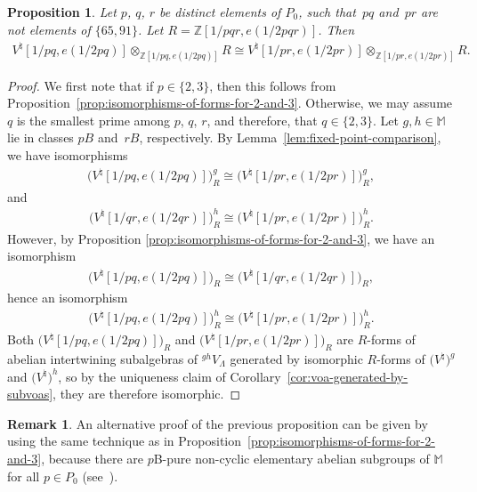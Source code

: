 \documentclass[pdftex]{sigma}
\newcommand{\bM}{\mathbb{M}}
\newcommand{\bZ}{\mathbb{Z}}
\newtheorem{prop}[thm]{Proposition}
\theoremstyle{definition}
\newtheorem{rem}[thm]{Remark}
\begin{document}
\begin{prop} \label{prop:full-comparison-of-forms} Let $p$, $q$, $r$ be distinct elements of $P_0$, such that~$pq$ and~$pr$ are not elements of $\{ 65, 91\}$. Let $R = \bZ[1/pqr,e(1/2pqr)]$. Then
\begin{gather*} V^\natural[1/pq, e(1/2pq)] \otimes_{\bZ[1/pq, e(1/2pq)]} R \cong V^\natural[1/pr, e(1/2pr)] \otimes_{\bZ[1/pr, e(1/2pr)]} R. \end{gather*}
\end{prop}
\begin{proof}
We first note that if $p \in \{2,3\}$, then this follows from Proposition~\ref{prop:isomorphisms-of-forms-for-2-and-3}. Otherwise, we may assume $q$ is the smallest prime among $p$, $q$, $r$, and therefore, that $q \in \{2,3\}$. Let $g,h \in \bM$ lie in classes $pB$ and~$rB$, respectively. By Lemma~\ref{lem:fixed-point-comparison}, we have isomorphisms
\begin{gather*} \big(V^\natural[1/pq,e(1/2pq)]\big)^g_R \cong \big(V^\natural[1/pr,e(1/2pr)]\big)^g_R, \end{gather*}
and
\begin{gather*} \big(V^\natural[1/qr,e(1/2qr)]\big)^h_R \cong \big(V^\natural[1/pr,e(1/2pr)]\big)^h_R. \end{gather*}
However, by Proposition \ref{prop:isomorphisms-of-forms-for-2-and-3}, we have an isomorphism
\begin{gather*} \big(V^\natural[1/pq,e(1/2pq)]\big)_R \cong \big(V^\natural[1/qr,e(1/2qr)]\big)_R, \end{gather*}
hence an isomorphism
\begin{gather*} \big(V^\natural[1/pq,e(1/2pq)]\big)^h_R \cong \big(V^\natural[1/pr,e(1/2pr)]\big)^h_R. \end{gather*}
Both $\big(V^\natural[1/pq,e(1/2pq)]\big)_R$ and $\big(V^\natural[1/pr,e(1/2pr)]\big)_R$ are $R$-forms of abelian intertwining subalgebras of ${}^{gh}V_\Lambda$ generated by isomorphic $R$-forms of $\big(V^\natural\big)^g$ and $\big(V^\natural\big)^h$, so by the uniqueness claim of Corollary~\ref{cor:voa-generated-by-subvoas}, they are therefore isomorphic.
\end{proof}

\begin{rem}An alternative proof of the previous proposition can be given by using the same technique as in Proposition~\ref{prop:isomorphisms-of-forms-for-2-and-3}, because there are $p$B-pure non-cyclic elementary abelian subgroups of $\bM$ for all $p \in P_0$ (see~\cite{W88}).
\end{rem}
\end{document}
